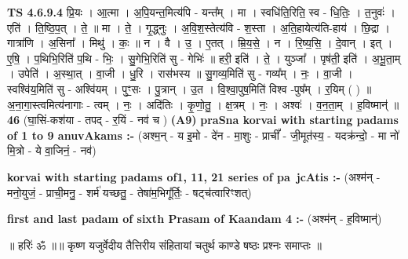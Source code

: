 \documentclass[17pt]{extarticle}
\begin{document}
                  \newline
                                \textbf{ TS 4.6.9.4} \newline
                  प्रि॒यः । आ॒त्मा । अ॒पि॒यन्त॒मित्य॑पि - यन्त᳚म् । मा । स्वधि॑ति॒रिति॒ स्व - धि॒तिः॒ । त॒नुवः॑ । एति॑ । ति॒ष्ठि॒प॒त् । ते॒ ॥ मा । ते॒ । गृ॒द्ध्नुः । अ॒वि॒श॒स्तेत्य॑वि - श॒स्ता । अ॒ति॒हायेत्य॑ति-हाय॑ । छि॒द्रा । गात्रा॑णि । अ॒सिना᳚ । मिथु॑ । कः॒ ॥ न । वै । उ॒ । ए॒तत् । म्रि॒य॒से॒ । न । रि॒ष्य॒सि॒ । दे॒वान् । इत् । ए॒षि॒ । प॒थिभि॒रिति॑ प॒थि - भिः॒ । सु॒गेभि॒रिति॑ सु - गेभिः॑ ॥ हरी॒ इति॑ । ते॒ । युञ्जा᳚ । पृष॑ती॒ इति॑ । अ॒भू॒ता॒म् । उपेति॑ । अ॒स्था॒त् । वा॒जी । धु॒रि । रास॑भस्य ॥ सु॒गव्य॒मिति॑ सु - गव्य᳚म् । नः॒ । वा॒जी । स्वश्वि॑य॒मिति॑ सु - अश्वि॑यम् । पुꣳ॒॒सः । पु॒त्रान् । उ॒त । वि॒श्वा॒पुष॒मिति॑ विश्व -पुष᳚म् । र॒यिम् ( ) ॥ अ॒ना॒गा॒स्त्वमित्य॑नागाः - त्वम् । नः॒ । अदि॑तिः । कृ॒णो॒तु॒ । क्ष॒त्रम् । नः॒ । अश्वः॑ । व॒न॒ता॒म् । ह॒विष्मान्॑ ॥ \textbf{  46 } \newline
                  \newline
                      (घा॒सिं-कश॑या - तपद् - र॒यिं - नव॑ च )  \textbf{(A9)} \newline \newline
\textbf{praSna korvai with starting padams of 1 to 9 anuvAkams :-} \newline
(अश्म॒न् - य इ॒मो - दे॑न - मा॒शुः - प्राचीं᳚ - जी॒मूत॑स्य॒ - यदक्र॑न्दो॒ - मा नो॑ मि॒त्रो - ये वा॒जिनं॒ - नव॑) \newline

\textbf{korvai with starting padams of1, 11, 21 series of pa~jcAtis :-} \newline
(अश्म॑न् - मनो॒युजं॒ - प्राची॒मनु॒ - शर्म॑ यच्छतु॒ - तेषा॑म॒भिगू᳚र्तिः॒ - षट्च॑त्वारिꣳशत्) \newline

\textbf{first and last padam of sixth Prasam of Kaandam 4 :-} \newline
(अश्म॑न् - ह॒विष्मान्॑) \newline 


॥ हरिः॑ ॐ ॥॥ कृष्ण यजुर्वेदीय तैत्तिरीय संहितायां चतुर्थ काण्डे षष्ठः प्रश्नः समाप्तः ॥ \newline
\pagebreak
\pagebreak
        
\end{document}
